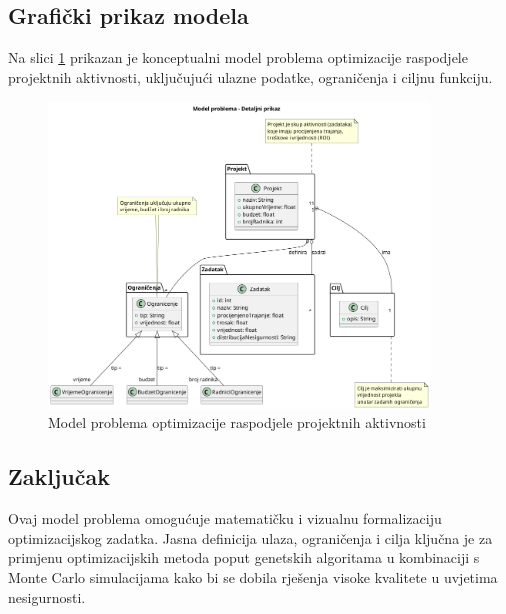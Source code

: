 \subsection{Grafički prikaz modela}
Na slici \ref{fig:model_problema} prikazan je konceptualni model problema optimizacije raspodjele projektnih aktivnosti, uključujući ulazne podatke, ograničenja i ciljnu funkciju.

\begin{figure}
    \centering
    \includegraphics[width=0.9\textwidth]{slike/model_problema.png}
    \caption{Model problema optimizacije raspodjele projektnih aktivnosti}
    \label{fig:model_problema}
\end{figure}

\subsection{Zaključak}
Ovaj model problema omogućuje matematičku i vizualnu formalizaciju optimizacijskog zadatka. Jasna definicija ulaza, ograničenja i cilja ključna je za primjenu optimizacijskih metoda poput genetskih algoritama \cite{Goldberg1989} u kombinaciji s Monte Carlo simulacijama kako bi se dobila rješenja visoke kvalitete u uvjetima nesigurnosti.
